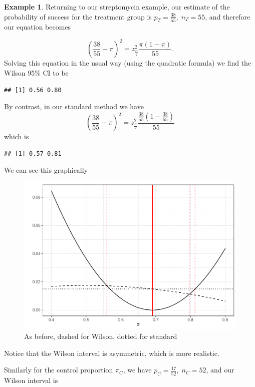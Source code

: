 \documentclass[
  openany]{book}
\theoremstyle{definition}
\theoremstyle{definition}
\newtheorem{example}{Example}[chapter]
\theoremstyle{definition}
\theoremstyle{definition}
\theoremstyle{remark}
\begin{document}
\begin{example}

Returning to our streptomycin example, our estimate of the probability of success for the treatment group is \(p_T = \frac{38}{55},\;n_T = 55\), and therefore our equation becomes

\[\left(\frac{38}{55} - \pi\right)^2 = z^2_{\frac{\alpha}{2}}\frac{\pi\left(1-\pi\right)}{55}.\]
Solving this equation in the usual way (using the quadratic formula) we find the Wilson 95\% CI to be

\begin{verbatim}
## [1] 0.56 0.80
\end{verbatim}

By contrast, in our standard method we have
\[\left(\frac{38}{55} - \pi\right)^2 = z^2_{\frac{\alpha}{2}}\frac{\frac{38}{55}\left(1-\frac{38}{55}\right)}{55}\]
which is

\begin{verbatim}
## [1] 0.57 0.81
\end{verbatim}

We can see this graphically

\begin{figure}
\centering
\includegraphics{CT4H_notes_files/figure-latex/unnamed-chunk-32-1.pdf}
\caption{\label{fig:unnamed-chunk-32}As before, dashed for Wilson, dotted for standard}
\end{figure}

Notice that the Wilson interval is asymmetric, which is more realistic.

Similarly for the control proportion \(\pi_C\), we have \(p_C = \frac{17}{52},\; n_C=52\), and our Wilson interval is


\end{example}
\end{document}
